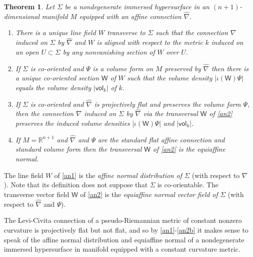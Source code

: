 \documentclass [leqno, 10pt]{amsart}
\newtheorem{theorem}{Theorem}[section]
\theoremstyle{definition}
\numberwithin{equation}{section}
\newcommand{\imt}{\iota}
\newcommand{\vol}{\mathsf{vol}}
\newcommand{\nm}{\mathsf{W}}
\newcommand{\hnabla}{\widehat{\nabla}}
\newcommand{\rea}{\mathbb R}
\begin{document}
\begin{theorem}\label{projnormaltheorem}
Let $\Sigma$ be a nondegenerate immersed hypersurface in an $(n+1)$-dimensional manifold $M$ equipped with an affine connection $\hnabla$. 
\begin{enumerate}
\item\label{an1} There is a unique line field $W$ transverse to $\Sigma$ such that the connection $\nabla$ induced on $\Sigma$ by $\hnabla$ and $W$ is aligned with respect to the metric $k$ induced on an open $U \subset \Sigma$ by any nonvanishing section of $W$ over $U$. 
\item\label{an2} If $\Sigma$ is co-oriented and $\Psi$ is a volume form on $M$ preserved by $\hnabla$ then there is a unique co-oriented section $\nm$ of $W$ such that the volume density $|\imt(\nm)\Psi|$ equals the volume density $|\vol_{k}|$ of $k$. 
\item\label{an2b} If $\Sigma$ is co-oriented and $\hnabla$ is projectively flat and preserves the volume form $\Psi$, then the connection $\nabla$ induced on $\Sigma$ by $\hnabla$ via the transversal $\nm$ of \eqref{an2} preserves the induced volume densities $|\imt(\nm)\Psi|$ and $|\vol_{k}|$.
\item\label{an3} If $M = \rea^{n+1}$ and $\hnabla$ and $\Psi$ are the standard flat affine connection and standard volume form then the transversal $\nm$ of \eqref{an2} is the equiaffine normal. 
\end{enumerate}
\end{theorem}

The line field $W$ of \eqref{an1} is the \textit{affine normal distribution of $\Sigma$} (with respect to $\hnabla$). Note that its definition does not suppose that $\Sigma$ is co-orientable.
The transverse vector field $\nm$ of \eqref{an2} is the \textit{equiaffine normal vector field of $\Sigma$} (with respect to $\hnabla$ and $\Psi$).

The Levi-Civita connection of a pseudo-Riemannian metric of constant nonzero curvature is projectively flat but not flat, and so by \eqref{an1}-\eqref{an2b} it makes sense to speak of the affine normal distribution and equiaffine normal of a nondegenerate immersed hypersurface in manifold equipped with a constant curvature metric.
\end{document}
